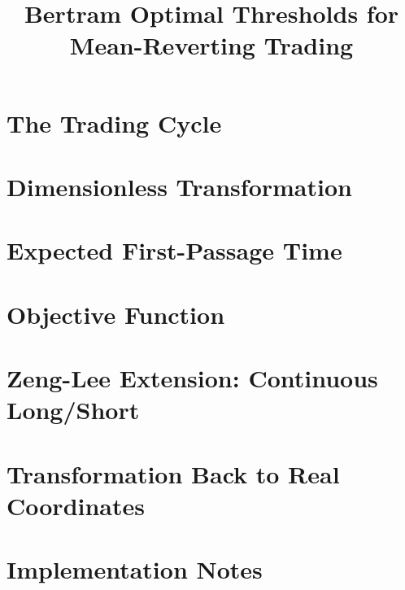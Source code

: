 \documentclass[11pt]{article}
\title{Bertram Optimal Thresholds for Mean-Reverting Trading}
\author{}
\date{}
\begin{document}
\maketitle


\section{The Trading Cycle}

\section{Dimensionless Transformation}

\section{Expected First-Passage Time}

\section{Objective Function}

\section{Zeng-Lee Extension: Continuous Long/Short}

\section{Transformation Back to Real Coordinates}

\section{Implementation Notes}
\end{document}
